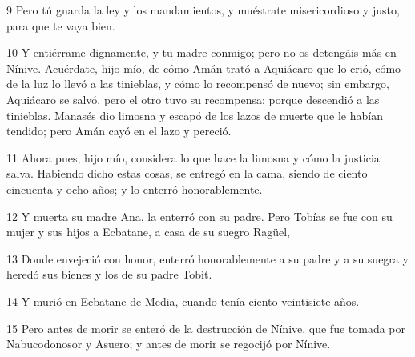 \par 9 Pero tú guarda la ley y los mandamientos, y muéstrate misericordioso y justo, para que te vaya bien.
\par 10 Y entiérrame dignamente, y tu madre conmigo; pero no os detengáis más en Nínive. Acuérdate, hijo mío, de cómo Amán trató a Aquiácaro que lo crió, cómo de la luz lo llevó a las tinieblas, y cómo lo recompensó de nuevo; sin embargo, Aquiácaro se salvó, pero el otro tuvo su recompensa: porque descendió a las tinieblas. Manasés dio limosna y escapó de los lazos de muerte que le habían tendido; pero Amán cayó en el lazo y pereció.
\par 11 Ahora pues, hijo mío, considera lo que hace la limosna y cómo la justicia salva. Habiendo dicho estas cosas, se entregó en la cama, siendo de ciento cincuenta y ocho años; y lo enterró honorablemente.
\par 12 Y muerta su madre Ana, la enterró con su padre. Pero Tobías se fue con su mujer y sus hijos a Ecbatane, a casa de su suegro Ragüel,
\par 13 Donde envejeció con honor, enterró honorablemente a su padre y a su suegra y heredó sus bienes y los de su padre Tobit.
\par 14 Y murió en Ecbatane de Media, cuando tenía ciento veintisiete años.
\par 15 Pero antes de morir se enteró de la destrucción de Nínive, que fue tomada por Nabucodonosor y Asuero; y antes de morir se regocijó por Nínive.

